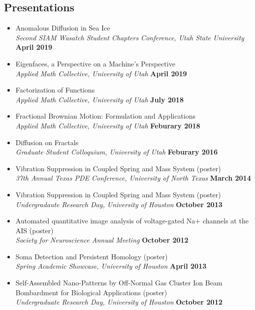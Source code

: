 \documentclass[margin,line]{res}
\begin{document}
\begin{resume}
\section{\sc Presentations}
\begin{itemize}
    \item[] Anomalous Diffusion in Sea Ice
        \\{\it Second SIAM Wasatch Student Chapters Conference, Utah State University} \hfill {\bf April 2019} 
    \item[] Eigenfaces, a Perspective on a Machine's Perspective
        \\{\it Applied Math Collective, University of Utah} \hfill {\bf April 2019}
    \item[] Factorization of Functions
        \\ {\it Applied Math Collective, University of Utah } \hfill {\bf July 2018} 
    \item[] Fractional Brownian Motion: Formulation and Applications
        \\ {\it Applied Math Collective, University of Utah} \hfill {\bf Feburary 2018} 
    \item[] Diffusion on Fractals
        \\ {\it Graduate Student Colloquium, University of Utah} \hfill {\bf Feburary 2016} 
    \item[] Vibration Suppression in Coupled Spring and Mass System (poster)
        \\ {\it 37th Annual Texas PDE Conference, University of North Texas} \hfill {\bf March 2014} 
    \item[] Vibration Suppression in Coupled Spring and Mass System (poster)
        \\ {\it Undergradaute Research Day, University of Houston} \hfill {\bf October 2013} 
    \item[] Automated quantitative image analysis of voltage-gated Na+ channels at the AIS (poster) 
    \\ {\it Society for Neuroscience Annual Meeting} \hfill {\bf October 2012} 
    \item[] Soma Detection and Persistent Homology (poster) 
    \\ {\it Spring Academic Showcase, University of Houston} \hfill {\bf April 2013} 
    \item[] Self-Assembled Nano-Patterns by Off-Normal Gas Cluster  Ion Beam Bombardment for Biological Applications (poster) 
    \\ {\it Undergraduate Research Day, University of Houston} \hfill {\bf October 2012} 
\end{itemize}


\end{resume}
\end{document}
